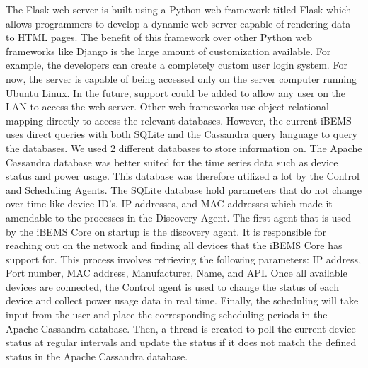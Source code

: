\documentclass[conference]{IEEEtran}
\begin{document}
The Flask web server is built using a Python web framework titled Flask which
allows programmers to develop a dynamic web server capable of rendering data to
HTML pages. The benefit of this framework over other Python web frameworks like
Django is the large amount of customization available. For example, the
developers can create a completely custom user login system. For now, the server
is capable of being accessed only on the server computer running Ubuntu Linux.
In the future, support could be added to allow any user on the LAN to access the
web server. Other web frameworks use object relational mapping directly to
access the relevant databases. However, the current iBEMS uses direct queries with both
SQLite and the Cassandra query language to query the databases. We used
2 different databases to store information on. The Apache Cassandra database was
better suited for the time series data such as device status and power usage.
This database was therefore utilized a lot by the Control and Scheduling Agents.
The SQLite database hold parameters that do not change over time like device
ID's, IP addresses, and MAC addresses which made it amendable to the processes
in the Discovery Agent. The first agent that is
used by the iBEMS Core on startup is the discovery agent. It is responsible for
reaching out on the network and finding all devices that the iBEMS Core has
support for. This process involves retrieving the following parameters: IP
address, Port number, MAC address, Manufacturer, Name, and API. Once all
available devices are connected, the Control agent is used to change the status
of each device and collect power usage data in real time. Finally, the
scheduling will take input from the user and place the corresponding scheduling
periods in the Apache Cassandra database. Then, a thread is created to poll the
current device status at regular intervals and update the status if it does not
match the defined status in the Apache Cassandra database.
\end{document}
